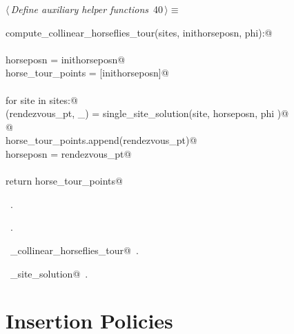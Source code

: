 \documentclass[11.5pt]{report}
\begin{document}
\begin{flushleft} \small
\begin{minipage}{\linewidth}\label{scrap44}\raggedright\small
{} $\langle\,${\itshape Define auxiliary helper functions}\nobreak\ {\footnotesize {40}}$\,\rangle\equiv$
\vspace{-1ex}
\begin{list}{}{} \item
\mbox{}\verb@def compute_collinear_horseflies_tour(sites, inithorseposn, phi):@\\
\mbox{}\verb@@\\
\mbox{}\verb@      horseposn         = inithorseposn@\\
\mbox{}\verb@      horse_tour_points = [inithorseposn]@\\
\mbox{}\verb@@\\
\mbox{}\verb@      for site in sites:@\\
\mbox{}\verb@          (rendezvous_pt, _) = single_site_solution(site, horseposn, phi )@\\
\mbox{}\verb@            @\\
\mbox{}\verb@          horse_tour_points.append(rendezvous_pt)@\\
\mbox{}\verb@          horseposn = rendezvous_pt@\\
\mbox{}\verb@@\\
\mbox{}\verb@      return horse_tour_points@\\
\mbox{}\verb@@{\NWsep}
\end{list}
\vspace{-1.5ex}
\footnotesize
\begin{list}{}{\setlength{\itemsep}{-\parsep}\setlength{\itemindent}{-\leftmargin}}
\item \NWtxtMacroDefBy\ .
\item \NWtxtMacroRefIn\ .
\item \NWtxtIdentsDefed\nobreak\  \verb@compute_collinear_horseflies_tour@\nobreak\ .\item \NWtxtIdentsUsed\nobreak\  \verb@single_site_solution@\nobreak\ .
\item{}
\end{list}
\end{minipage}\vspace{4ex}
\end{flushleft}
\section{Insertion Policies} 
\label{subsec:insertion-policies}
\end{document}
